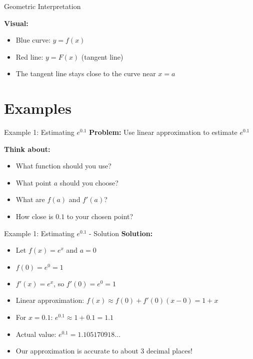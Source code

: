 \documentclass[aspectratio=169]{beamer}
\begin{document}
\begin{frame}{Geometric Interpretation}
\begin{center}
\end{center}

\textbf{Visual:}
\begin{itemize}
    \item Blue curve: $y = f(x)$
    \item Red line: $y = F(x)$ (tangent line)
    \item The tangent line stays close to the curve near $x = a$
\end{itemize}
\end{frame}

\section{Examples}

\begin{frame}{Example 1: Estimating $e^{0.1}$}
\textbf{Problem:} Use linear approximation to estimate $e^{0.1}$

\textbf{Think about:}
\begin{itemize}
    \item What function should you use?
    \item What point $a$ should you choose?
    \item What are $f(a)$ and $f'(a)$?
    \item How close is $0.1$ to your chosen point?
\end{itemize}
\end{frame}

\begin{frame}{Example 1: Estimating $e^{0.1}$ - Solution}
\textbf{Solution:}
\begin{itemize}
    \item Let $f(x) = e^x$ and $a = 0$
    \item $f(0) = e^0 = 1$
    \item $f'(x) = e^x$, so $f'(0) = e^0 = 1$
    \item Linear approximation: $f(x) \approx f(0) + f'(0)(x-0) = 1 + x$
    \item For $x = 0.1$: $e^{0.1} \approx 1 + 0.1 = 1.1$
    \item Actual value: $e^{0.1} = 1.105170918...$
    \item Our approximation is accurate to about 3 decimal places!
\end{itemize}
\end{frame}
\end{document}
